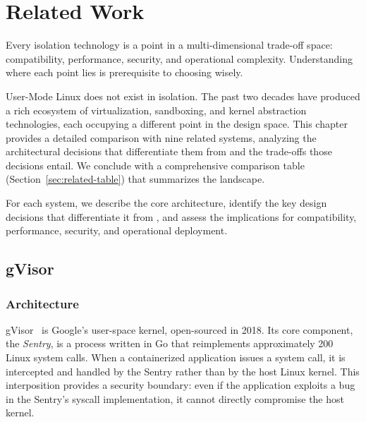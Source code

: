 \chapter{Related Work}
\label{ch:related}

\epigraph{%
  Every isolation technology is a point in a multi-dimensional
  trade-off space: compatibility, performance, security, and
  operational complexity.  Understanding where each point lies is
  prerequisite to choosing wisely.%
}{}

User-Mode Linux does not exist in isolation.  The past two decades have
produced a rich ecosystem of virtualization, sandboxing, and kernel
abstraction technologies, each occupying a different point in the
design space.  This chapter provides a detailed comparison with nine
related systems, analyzing the architectural decisions that differentiate
them from \UML{} and the trade-offs those decisions entail.  We conclude
with a comprehensive comparison table (Section~\ref{sec:related-table})
that summarizes the landscape.

For each system, we describe the core architecture, identify the key
design decisions that differentiate it from \UML{}, and assess the
implications for compatibility, performance, security, and operational
deployment.


\section{gVisor}
\label{sec:related-gvisor}

\subsection{Architecture}

gVisor~\cite{gvisor} is Google's user-space kernel, open-sourced in
2018.  Its core component, the \emph{Sentry}, is a process written
in Go that reimplements approximately 200 Linux system calls.  When
a containerized application issues a system call, it is intercepted
and handled by the Sentry rather than by the host Linux kernel.  This
interposition provides a security boundary: even if the application
exploits a bug in the Sentry's syscall implementation, it cannot
directly compromise the host kernel.

